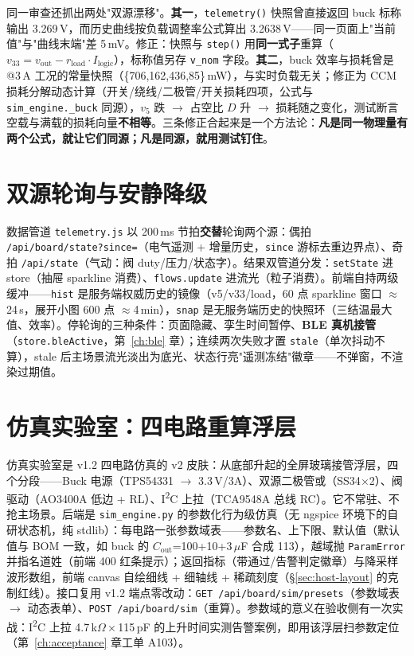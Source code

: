 同一审查还抓出两处"双源漂移"。\textbf{其一}，\texttt{telemetry()} 快照曾直接返回 buck 标称输出 3.269\,V，而历史曲线按负载调整率公式算出 3.2638\,V——同一页面上"当前值"与"曲线末端"差 5\,mV。修正：快照与 \texttt{step()} 用\textbf{同一式子}重算（$v_{33}=v_\text{out}-r_\text{load}\cdot I_\text{logic}$），标称值另存 \texttt{v\_nom} 字段。\textbf{其二}，buck 效率与损耗曾是 @3\,A 工况的常量快照（\{706,162,436,85\}\,mW），与实时负载无关；修正为 CCM 损耗分解动态计算（开关/绕线/二极管/开关损耗四项，公式与 \texttt{sim\_engine.\_buck} 同源），$v_5$ 跌 $\to$ 占空比 $D$ 升 $\to$ 损耗随之变化，测试断言空载与满载的损耗向量\textbf{不相等}。三条修正合起来是一个方法论：\textbf{凡是同一物理量有两个公式，就让它们同源；凡是同源，就用测试钉住}。

\section{双源轮询与安静降级}
\label{sec:host-telemetry}

数据管道 \texttt{telemetry.js} 以 200\,ms 节拍\textbf{交替}轮询两个源：偶拍 \texttt{/api/board/state?since=}（电气遥测 + 增量历史，\texttt{since} 游标去重边界点）、奇拍 \texttt{/api/state}（气动：阀 duty/压力/状态字）。结果双管道分发：\texttt{setState} 进 store（抽屉 sparkline 消费）、\texttt{flows.update} 进流光（粒子消费）。前端自持两级缓冲——\texttt{hist} 是服务端权威历史的镜像（v5/v33/load，60 点 sparkline 窗口 $\approx$24\,s，展开小图 600 点 $\approx$4\,min），\texttt{snap} 是无服务端历史的快照环（三结温最大值、效率）。停轮询的三种条件：页面隐藏、孪生时间暂停、\textbf{BLE 真机接管}（\texttt{store.bleActive}，第~\ref{ch:ble} 章）；连续两次失败才置 \texttt{stale}（单次抖动不算），stale 后主场景流光淡出为底光、状态行亮"遥测冻结"徽章——不弹窗，不渲染过期值。

\section{仿真实验室：四电路重算浮层}
\label{sec:host-simlab}

仿真实验室是 v1.2 四电路仿真的 v2 皮肤：从底部升起的全屏玻璃接管浮层，四个分段——Buck 电源（TPS54331 $\to$ 3.3\,V/3A）、双源二极管或（SS34$\times$2）、阀驱动（AO3400A 低边 + RL）、I\textsuperscript{2}C 上拉（TCA9548A 总线 RC）。它不常驻、不抢主场景。后端是 \texttt{sim\_engine.py} 的参数化行为级仿真（无 ngspice 环境下的自研状态机，纯 stdlib）：每电路一张参数域表——参数名、上下限、默认值（默认值与 BOM 一致，如 buck 的 $C_\text{out}$=100+10+3\,$\mu$F 合成 113），越域抛 \texttt{ParamError} 并指名道姓（前端 400 红条提示）；返回指标（带通过/告警判定徽章）与降采样波形数组，前端 canvas 自绘细线 + 细轴线 + 稀疏刻度（\S\ref{sec:host-layout} 的克制红线）。接口复用 v1.2 端点零改动：\texttt{GET /api/board/sim/presets}（参数域表 $\to$ 动态表单）、\texttt{POST /api/board/sim}（重算）。参数域的意义在验收侧有一次实战：I\textsuperscript{2}C 上拉 4.7\,k$\Omega\times$115\,pF 的上升时间实测告警案例，即用该浮层扫参数定位（第~\ref{ch:acceptance} 章工单 A103）。

